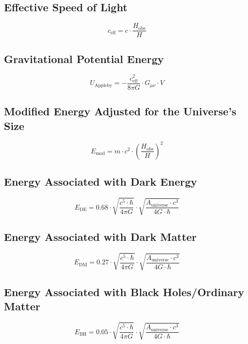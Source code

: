 \documentclass[a4paper, 11pt]{article}
\begin{document}
\subsection{Effective Speed of Light}
\begin{equation}
c_{\text{eff}} = c \cdot \frac{H_{\text{obs}}}{H}
\end{equation}

\subsection{Gravitational Potential Energy}
\begin{equation}
U_{\text{Appleby}} = -\frac{c_{\text{eff}}^2}{8 \pi G} \cdot G_{\mu\nu} \cdot V
\end{equation}

\subsection{Modified Energy Adjusted for the Universe’s Size}
\begin{equation}
E_{\text{mod}} = m \cdot c^2 \cdot \left(\frac{H_{\text{obs}}}{H}\right)^2
\end{equation}

\subsection{Energy Associated with Dark Energy}
\begin{equation}
E_{\text{DE}} = 0.68 \cdot \sqrt{\frac{c^5 \cdot \hbar}{4 \pi G}} \cdot \sqrt{\frac{A_{\text{universe}} \cdot c^3}{4G \cdot \hbar}}
\end{equation}

\subsection{Energy Associated with Dark Matter}
\begin{equation}
E_{\text{DM}} = 0.27 \cdot \sqrt{\frac{c^5 \cdot \hbar}{4 \pi G}} \cdot \sqrt{\frac{A_{\text{universe}} \cdot c^3}{4G \cdot \hbar}}
\end{equation}

\subsection{Energy Associated with Black Holes/Ordinary Matter}
\begin{equation}
E_{\text{BH}} = 0.05 \cdot \sqrt{\frac{c^5 \cdot \hbar}{4 \pi G}} \cdot \sqrt{\frac{A_{\text{universe}} \cdot c^3}{4G \cdot \hbar}}
\end{equation}
\end{document}
